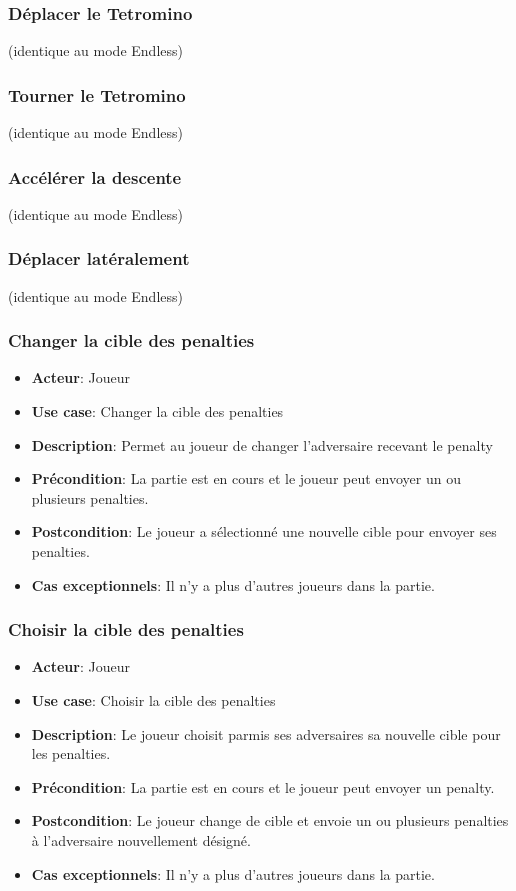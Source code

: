 \documentclass{article}
\begin{document}
\subsubsection*{Déplacer le Tetromino} (identique au mode Endless)
\subsubsection*{Tourner le Tetromino} (identique au mode Endless)
\subsubsection*{Accélérer la descente} (identique au mode Endless)
\subsubsection*{Déplacer latéralement} (identique au mode Endless)

\subsubsection*{Changer la cible des penalties}
\begin{itemize}
    \item \textbf{Acteur}: Joueur
    \item \textbf{Use case}: Changer la cible des penalties
    \item \textbf{Description}: Permet au joueur de changer l'adversaire recevant le penalty
    \item \textbf{Précondition}: La partie est en cours et le joueur peut envoyer un ou plusieurs penalties.
    \item \textbf{Postcondition}: Le joueur a sélectionné une nouvelle cible pour envoyer ses penalties.
    \item \textbf{Cas exceptionnels}: Il n'y a plus d'autres joueurs dans la partie.
\end{itemize}

\subsubsection*{Choisir la cible des penalties}
\begin{itemize}
    \item \textbf{Acteur}: Joueur
    \item \textbf{Use case}: Choisir la cible des penalties
    \item \textbf{Description}: Le joueur choisit parmis ses adversaires sa nouvelle cible pour les penalties.
    \item \textbf{Précondition}: La partie est en cours et le joueur peut envoyer un penalty.
    \item \textbf{Postcondition}: Le joueur change de cible et envoie un ou plusieurs penalties à l’adversaire nouvellement désigné.
    \item \textbf{Cas exceptionnels}: Il n'y a plus d'autres joueurs dans la partie.
\end{itemize}
\end{document}
